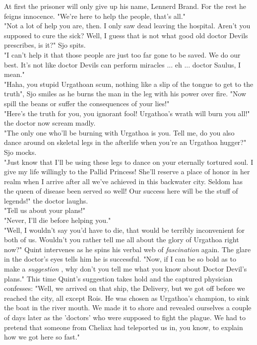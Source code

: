 At first the prisoner will only give up his name, Lennerd Brand. For the rest he feigns innocence. "We're here to help the people, that's all."\\

"Not a lot of help you are, then. I only saw dead leaving the hospital. Aren't you supposed to cure the sick? Well, I guess that is not what good old doctor Devils prescribes, is it?" Sjo spits.\\

"I can't help it that those people are just too far gone to be saved. We do our best. It's not like doctor Devils can perform miracles ... eh ... doctor Saulus, I mean."\\

"Haha, you stupid Urgathoan scum, nothing like a slip of the tongue to get to the truth", Sjo smiles as he burns the man in the leg with his power over fire. "Now spill the beans or suffer the consequences of your lies!"\\

"Here's the truth for you, you ignorant fool! Urgathoa's wrath will burn you all!" the doctor now scream madly.\\

"The only one who'll be burning with Urgathoa is you. Tell me, do you also dance around on skeletal legs in the afterlife when you're an Urgathoa hugger?" Sjo mocks.\\

"Just know that I'll be using these legs to dance on your eternally tortured soul. I give my life willingly to the Pallid Princess! She'll reserve a place of honor in her realm when I arrive after all we've achieved in this backwater city. Seldom has the queen of disease been served so well! Our success here will be the stuff of legends!" the doctor laughs.\\

"Tell us about your plans!"\\

"Never, I'll die before helping you."\\

"Well, I wouldn't say you'd have to die, that would be terribly inconvenient for both of us. Wouldn't you rather tell me all about the glory of Urgathoa right now?" Quint intervenes as he spins his verbal web of {\itshape fascination} again. The glare in the doctor's eyes tells him he is successful. "Now, if I can be so bold as to make a  {\itshape suggestion} , why don't you tell me what you know about Doctor Devil's plans." This time Quint's suggestion takes hold and the captured physician confesses: "Well, we arrived on that ship, the Delivery, but we got off before we reached the city, all except Rois. He was chosen as Urgathoa's champion, to sink the boat in the river mouth. We made it to shore and revealed ourselves a couple of days later as the 'doctors' who were supposed to fight the plague. We had to pretend that someone from Cheliax had teleported us in, you know, to explain how we got here so fast."\\

